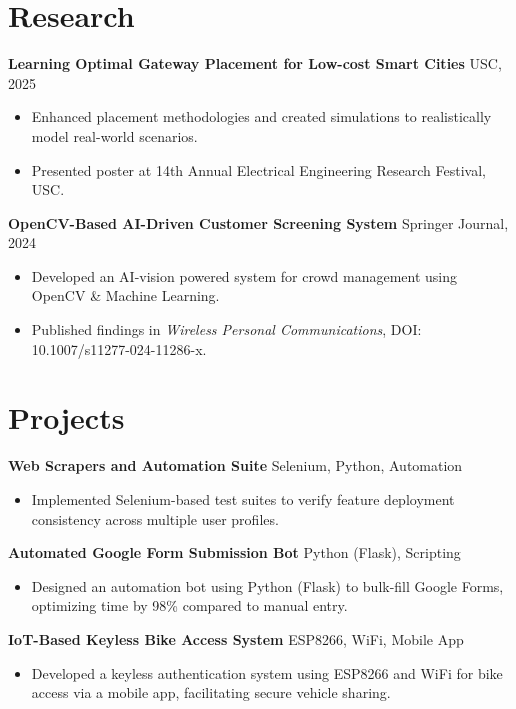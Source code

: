\documentclass[letterpaper,10pt]{article}
\begin{document}
\section*{Research}
    \textbf{Learning Optimal Gateway Placement for Low-cost Smart Cities} \hfill USC, 2025
    \begin{itemize}[leftmargin=*]
        \item Enhanced placement methodologies and created simulations to realistically model real-world scenarios.
        \item Presented poster at 14th Annual Electrical Engineering Research Festival, USC.
    \end{itemize}
    
    \textbf{OpenCV-Based AI-Driven Customer Screening System} \hfill Springer Journal, 2024
    \begin{itemize}[leftmargin=*]
        \item Developed an AI-vision powered system for crowd management using OpenCV \& Machine Learning.
        \item Published findings in \textit{Wireless Personal Communications}, DOI: 10.1007/s11277-024-11286-x.
    \end{itemize}

\section*{Projects}
    \textbf{Web Scrapers and Automation Suite} \hfill Selenium, Python, Automation
    \begin{itemize}[leftmargin=*]
        \item Implemented Selenium-based test suites to verify feature deployment consistency across multiple user profiles.
    \end{itemize}

    \textbf{Automated Google Form Submission Bot} \hfill Python (Flask), Scripting
    \begin{itemize}[leftmargin=*]
        \item Designed an automation bot using Python (Flask) to bulk-fill Google Forms, optimizing time by 98\% compared to manual entry.
    \end{itemize}

    \textbf{IoT-Based Keyless Bike Access System} \hfill ESP8266, WiFi, Mobile App
    \begin{itemize}[leftmargin=*]
        \item Developed a keyless authentication system using ESP8266 and WiFi for bike access via a mobile app, facilitating secure vehicle sharing.
    \end{itemize}
    
\end{document}

